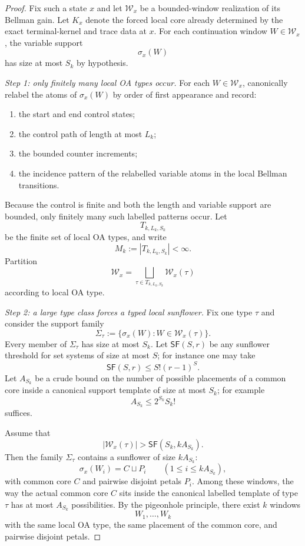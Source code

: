 \documentclass[11pt]{article}
\theoremstyle{definition}
\newcommand{\1}{\mathbf{1}}
\begin{document}
\begin{proof}
Fix such a state $x$ and let $\mathcal W_x$ be a bounded-window realization of its Bellman gain. Let $K_x$ denote the forced local core already determined by the exact terminal-kernel and trace data at $x$. For each continuation window $W\in \mathcal W_x$, the variable support
\[
\sigma_x(W)
\]
has size at most $S_k$ by hypothesis.

\emph{Step 1: only finitely many local OA types occur.}
For each $W\in \mathcal W_x$, canonically relabel the atoms of $\sigma_x(W)$ by order of first appearance and record:
\begin{enumerate}[label=(\alph*),leftmargin=2.2em]
\item the start and end control states;
\item the control path of length at most $L_k$;
\item the bounded counter increments;
\item the incidence pattern of the relabelled variable atoms in the local Bellman transitions.
\end{enumerate}
Because the control is finite and both the length and variable support are bounded, only finitely many such labelled patterns occur. Let
\[
T_{k,L_k,S_k}
\]
be the finite set of local OA types, and write
\[
M_k:=|T_{k,L_k,S_k}|<\infty.
\]
Partition
\[
\mathcal W_x=\bigsqcup_{\tau\in T_{k,L_k,S_k}} \mathcal W_x(\tau)
\]
according to local OA type.

\emph{Step 2: a large type class forces a typed local sunflower.}
Fix one type $\tau$ and consider the support family
\[
\Sigma_\tau:=\{\sigma_x(W): W\in \mathcal W_x(\tau)\}.
\]
Every member of $\Sigma_\tau$ has size at most $S_k$. Let $\mathsf{SF}(S,r)$ be any sunflower threshold for set systems of size at most $S$; for instance one may take
\[
\mathsf{SF}(S,r)\le S!(r-1)^S.
\]
Let $A_{S_k}$ be a crude bound on the number of possible placements of a common core inside a canonical support template of size at most $S_k$; for example
\[
A_{S_k}\le 2^{S_k}S_k!
\]
suffices.

Assume that
\[
|\mathcal W_x(\tau)|>\mathsf{SF}(S_k,kA_{S_k}).
\]
Then the family $\Sigma_\tau$ contains a sunflower of size $kA_{S_k}$:
\[
\sigma_x(W_i)=C\sqcup P_i
\qquad (1\le i\le kA_{S_k}),
\]
with common core $C$ and pairwise disjoint petals $P_i$. Among these windows, the way the actual common core $C$ sits inside the canonical labelled template of type $\tau$ has at most $A_{S_k}$ possibilities. By the pigeonhole principle, there exist $k$ windows
\[
W_1,\dots,W_k
\]
with the same local OA type, the same placement of the common core, and pairwise disjoint petals.


\end{proof}
\end{document}
